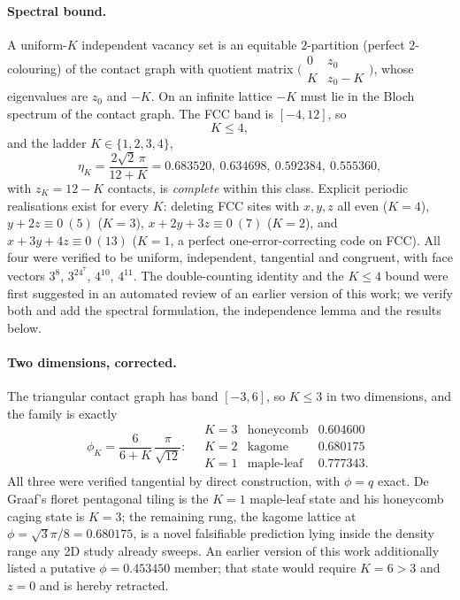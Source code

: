 \documentclass[11pt]{article}
\begin{document}
\paragraph{Spectral bound.} A uniform-$K$ independent vacancy set is an
equitable $2$-partition (perfect $2$-colouring) of the contact graph with
quotient matrix $\bigl(\begin{smallmatrix}0 & z_0\\ K & z_0-K\end{smallmatrix}\bigr)$,
whose eigenvalues are $z_0$ and $-K$. On an infinite lattice $-K$ must lie in
the Bloch spectrum of the contact graph. The FCC band is $[-4,12]$, so
\begin{equation}
K\leq 4 ,
\end{equation}
and the ladder $K\in\{1,2,3,4\}$,
\begin{equation}
\eta_K = \frac{2\sqrt2\,\pi}{12+K}
= 0.683520,\ 0.634698,\ 0.592384,\ 0.555360,
\label{eq:ladder}
\end{equation}
with $z_K = 12-K$ contacts, is \emph{complete} within this class. Explicit
periodic realisations exist for every $K$: deleting FCC sites with
$x,y,z$ all even ($K=4$), $y+2z\equiv0\ (5)$ ($K=3$),
$x+2y+3z\equiv0\ (7)$ ($K=2$), and $x+3y+4z\equiv0\ (13)$ ($K=1$, a perfect
one-error-correcting code on FCC). All four were verified to be uniform,
independent, tangential and congruent, with face vectors
$3^8$, $3^24^7$, $4^{10}$, $4^{11}$. The double-counting identity and the
$K\le4$ bound were first suggested in an automated review of an earlier version
of this work; we verify both and add the spectral formulation, the
independence lemma and the results below.

\paragraph{Two dimensions, corrected.} The triangular contact graph has band
$[-3,6]$, so $K\leq3$ in two dimensions, and the family is exactly
\begin{equation}
\phi_K=\frac{6}{6+K}\,\frac{\pi}{\sqrt{12}}:
\quad
\begin{array}{lll}
K=3 & \text{honeycomb} & 0.604600\\
K=2 & \text{kagome} & 0.680175\\
K=1 & \text{maple-leaf} & 0.777343 .
\end{array}
\end{equation}
All three were verified tangential by direct construction, with
$\phi=q$ exact. De Graaf's floret pentagonal tiling is the $K=1$ maple-leaf
state and his honeycomb caging state is $K=3$; the remaining rung, the kagome
lattice at $\phi=\sqrt3\pi/8=0.680175$, is a novel falsifiable prediction lying
inside the density range any 2D study already sweeps. An earlier version of
this work additionally listed a putative $\phi=0.453450$ member; that state
would require $K=6>3$ and $z=0$ and is hereby retracted.
\end{document}
